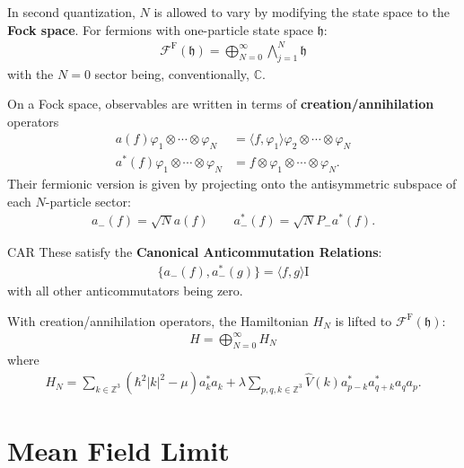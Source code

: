 \documentclass{beamer}
\begin{document}
\begin{frame}
	In second quantization, $N$ is allowed to vary by modifying the state space to the
	\textbf{Fock space}. For fermions with one-particle state space $\mathfrak{h}$:
	\begin{align*}
		\mathcal{F}^{\mathrm{F}}(\mathfrak{h}) = \bigoplus_{N=0}^\infty \bigwedge_{j=1}^N \mathfrak{h}
	\end{align*}
	with the $N=0$ sector being, conventionally, $\mathbb{C}$.
\end{frame}

\begin{frame}
	On a Fock space, observables are written in terms of \textbf{creation/annihilation}
	operators
	\begin{align*}
		a(f) \varphi_1\otimes\cdots\otimes\varphi_N
		&= \langle f,\varphi_1\rangle \varphi_2\otimes\cdots\otimes\varphi_N\\
		a^*(f)\varphi_1\otimes\cdots\otimes\varphi_N
		&= f\otimes\varphi_1\otimes\cdots\otimes\varphi_N.
	\end{align*}
	Their fermionic version is given by projecting onto the antisymmetric subspace of each
	$N$-particle sector:
	\begin{align*}
		a_-(f) = \sqrt{N}a(f)\qquad a^*_-(f) = \sqrt{N}P_-a^*(f).
	\end{align*}
	\begin{block}{CAR}
		These satisfy the \textbf{Canonical Anticommutation Relations}:
		\begin{align*}
			\{a_-(f),a^*_-(g)\} = \langle f,g\rangle\mathrm{I}
		\end{align*}
		with all other anticommutators being zero.
	\end{block}
\end{frame}

\begin{frame}
	With creation/annihilation operators, the Hamiltonian $H_N$ is lifted to
	$\mathcal{F}^{\mathrm{F}}(\mathfrak{h})$:
	\begin{align*}
		H = \bigoplus_{N=0}^\infty H_N
	\end{align*}
	where
	\begin{align*}
		H_N = \sum_{k\in\mathbb{Z}^3} (\hbar^2\vert k\vert^2 - \mu)a^*_k a_k
		+ \lambda \sum_{p,q,k\in\mathbb{Z}^3} \hat{V}(k)a^*_{p-k}a^*_{q+k} a_q a_p.
	\end{align*}
\end{frame}

\section{Mean Field Limit}
\end{document}
